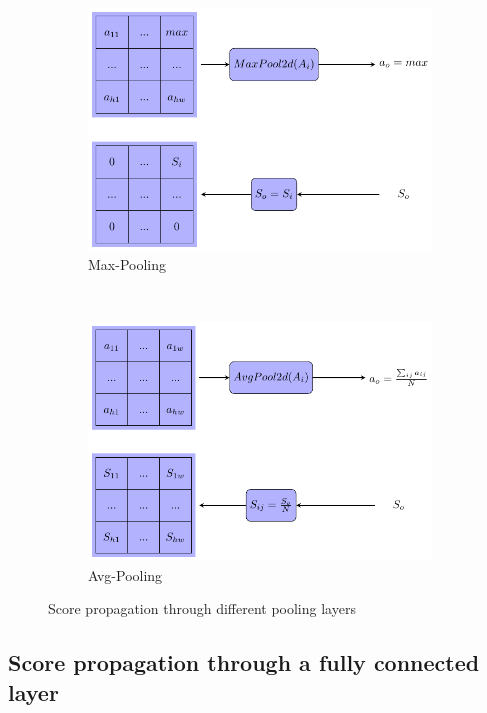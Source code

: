 \documentclass[review]{elsarticle}
\theoremstyle{definition} %
\theoremstyle{remark}
\begin{document}
\begin{figure}[!ht]
	\centering
	\begin{subfigure}{0.4\textwidth}
		\includegraphics[scale=0.4]{./figures/score_maxpool.pdf}
		\caption{Max-Pooling}
	\end{subfigure}
	~ %
	\begin{subfigure}{0.4\textwidth}
		\includegraphics[scale=0.4]{./figures/score_avgpool.pdf}
		\caption{Avg-Pooling}
	\end{subfigure}
	\caption{Score propagation through different pooling layers}
	\label{fig:score_pooling}
\end{figure}

\subsection{Score propagation through a fully connected layer} 
\end{document}
